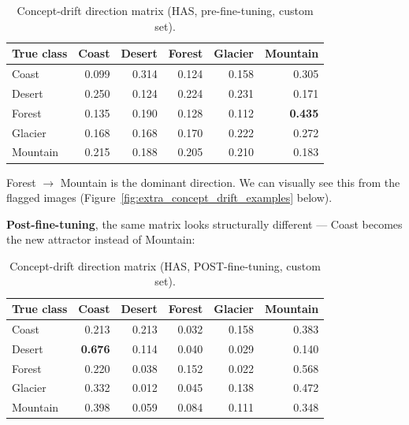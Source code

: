 \begin{table}[htbp]
\centering
\caption{Concept-drift direction matrix (HAS, pre-fine-tuning, custom set).}
\label{tab:extra_direction_landscape}
\begin{tabular}{@{} l rrrrr @{}}
\toprule
\textbf{True class} & \textbf{Coast} & \textbf{Desert} & \textbf{Forest} & \textbf{Glacier} & \textbf{Mountain} \\
\midrule
Coast    & 0.099 & 0.314 & 0.124 & 0.158 & 0.305 \\
Desert   & 0.250 & 0.124 & 0.224 & 0.231 & 0.171 \\
Forest   & 0.135 & 0.190 & 0.128 & 0.112 & \textbf{0.435} \\
Glacier  & 0.168 & 0.168 & 0.170 & 0.222 & 0.272 \\
Mountain & 0.215 & 0.188 & 0.205 & 0.210 & 0.183 \\
\bottomrule
\end{tabular}
\end{table}

Forest $\to$ Mountain is the dominant direction. We can visually see this from the flagged images
(Figure~\ref{fig:extra_concept_drift_examples} below).

\textbf{Post-fine-tuning}, the same matrix looks structurally different — Coast becomes the new
attractor instead of Mountain:

\begin{table}[htbp]
\centering
\caption{Concept-drift direction matrix (HAS, POST-fine-tuning, custom set).}
\label{tab:extra_direction_landscape_postft}
\begin{tabular}{@{} l rrrrr @{}}
\toprule
\textbf{True class} & \textbf{Coast} & \textbf{Desert} & \textbf{Forest} & \textbf{Glacier} & \textbf{Mountain} \\
\midrule
Coast    & 0.213 & 0.213 & 0.032 & 0.158 & 0.383 \\
Desert   & \textbf{0.676} & 0.114 & 0.040 & 0.029 & 0.140 \\
Forest   & 0.220 & 0.038 & 0.152 & 0.022 & 0.568 \\
Glacier  & 0.332 & 0.012 & 0.045 & 0.138 & 0.472 \\
Mountain & 0.398 & 0.059 & 0.084 & 0.111 & 0.348 \\
\bottomrule
\end{tabular}
\end{table}


